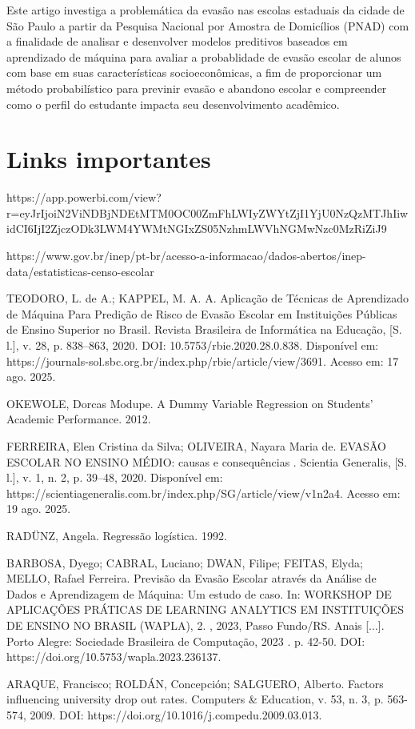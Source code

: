 \documentclass[english, spanish, brazilian]{RBIEarticle} %
\begin{document}
Este artigo investiga a problemática da evasão nas escolas estaduais da cidade de São Paulo a partir da Pesquisa Nacional por Amostra de Domicílios (PNAD) com a finalidade de analisar e desenvolver modelos preditivos baseados em aprendizado de máquina para avaliar a probablidade de evasão escolar de alunos com base em suas características socioeconômicas, a fim de proporcionar um método probabilístico para previnir evasão e abandono escolar e compreender como o perfil do estudante impacta seu desenvolvimento acadêmico. 

\section{Links importantes}
https://app.powerbi.com/view?r=eyJrIjoiN2ViNDBjNDEtMTM0OC00ZmFhLWIyZWYtZjI1YjU0NzQzMTJhIiwidCI6IjI2ZjczODk3LWM4YWMtNGIxZS05NzhmLWVhNGMwNzc0MzRiZiJ9

https://www.gov.br/inep/pt-br/acesso-a-informacao/dados-abertos/inep-data/estatisticas-censo-escolar

TEODORO, L. de A.; KAPPEL, M. A. A. Aplicação de Técnicas de Aprendizado de Máquina Para Predição de Risco de Evasão Escolar em Instituições Públicas de Ensino Superior no Brasil. Revista Brasileira de Informática na Educação, [S. l.], v. 28, p. 838–863, 2020. DOI: 10.5753/rbie.2020.28.0.838. Disponível em: https://journals-sol.sbc.org.br/index.php/rbie/article/view/3691. Acesso em: 17 ago. 2025.

OKEWOLE, Dorcas Modupe. A Dummy Variable Regression on Students' Academic Performance. 2012.

FERREIRA, Elen Cristina da Silva; OLIVEIRA, Nayara Maria de. EVASÃO ESCOLAR NO ENSINO MÉDIO: causas e consequências . Scientia Generalis, [S. l.], v. 1, n. 2, p. 39–48, 2020. Disponível em: https://scientiageneralis.com.br/index.php/SG/article/view/v1n2a4. Acesso em: 19 ago. 2025.

RADÜNZ, Angela. Regressão logística. 1992.

BARBOSA, Dyego; CABRAL, Luciano; DWAN, Filipe; FEITAS, Elyda; MELLO, Rafael Ferreira. Previsão da Evasão Escolar através da Análise de Dados e Aprendizagem de Máquina: Um estudo de caso. In: WORKSHOP DE APLICAÇÕES PRÁTICAS DE LEARNING ANALYTICS EM INSTITUIÇÕES DE ENSINO NO BRASIL (WAPLA), 2. , 2023, Passo Fundo/RS. Anais [...]. Porto Alegre: Sociedade Brasileira de Computação, 2023 . p. 42-50. DOI: https://doi.org/10.5753/wapla.2023.236137.

ARAQUE, Francisco; ROLDÁN, Concepción; SALGUERO, Alberto. Factors influencing university drop out rates. Computers & Education, v. 53, n. 3, p. 563-574, 2009. DOI: https://doi.org/10.1016/j.compedu.2009.03.013.
\end{document}
